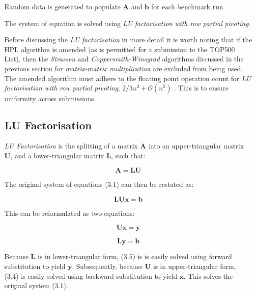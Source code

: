 Random data is generated to populate $\mathbf{A}$ and $\mathbf{b}$ for each benchmark run.

The system of equation is solved using \emph{LU factorisation with row partial pivoting}.

Before discussing the \emph{LU factorisation} in more detail it is worth noting that if the HPL algorithm is amended (as is permitted for a submission to the TOP500 List), then the \emph{Strassen} and \emph{Coppersmith-Winograd} algorithms discussed in the previous section for \emph{matrix-matrix multiplication} are excluded from being used. The amended algorithm must adhere to the floating point operation count for \emph{LU factorisation with row partial pivoting}, $2/3n^3 + \mathcal{O}(n^2)$ \cite{linpack-ppf}. This is to ensure uniformity across submissions. 

%
%
\subsection{LU Factorisation}

\emph{LU Factorisation} is the splitting of a matrix $\mathbf{A}$ into an upper-triangular matrix $\mathbf{U}$, and a lower-triangular matrix $\mathbf{L}$, such that:

\begin{equation}
\mathbf{A}=\mathbf{L}\mathbf{U}
\end{equation}

The original system of equations (3.1) can then be restated as:

\begin{equation}
\mathbf{L}\mathbf{U}\mathbf{x}=\mathbf{b}
\end{equation}

This can be reformulated as two equations:

\begin{equation}
\mathbf{U}\mathbf{x}=\mathbf{y}
\end{equation}

\begin{equation}
\mathbf{L}\mathbf{y}=\mathbf{b}
\end{equation}

Because $\mathbf{L}$ is in lower-triangular form, (3.5) is is easily solved using forward substitution to yield $\mathbf{y}$. Subsequently, because $\mathbf{U}$ is in upper-triangular form, (3.4) is easily solved using backward substitution to yield $\mathbf{x}$. This solves the original system (3.1).


